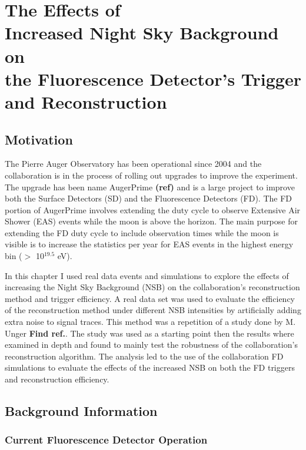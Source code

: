 \chapter[The Effects of Increased NSB on the FD Trigger and Reconstruction]{\centering The Effects of \\ Increased Night Sky Background on \\ the Fluorescence Detector's Trigger and Reconstruction \\ }\label{Ch:SelectEff}

\section{Motivation}

The Pierre Auger Observatory has been operational since 2004 and the collaboration is in the process of rolling out upgrades to improve the experiment. The upgrade has been name AugerPrime \textbf{(ref)} and is a large project to improve both the Surface Detectors (SD) and the Fluorescence Detectors (FD). The FD portion of AugerPrime involves extending the duty cycle to observe Extensive Air Shower (EAS) events while the moon is above the horizon. The main purpose for extending the FD duty cycle to include observation times while the moon is visible is to increase the statistics per year for EAS events in the highest energy bin ($>$ 10$^{19.5}$ eV). 

In this chapter I used real data events and simulations to explore the effects of increasing the Night Sky Background (NSB) on the collaboration's reconstruction method and trigger efficiency. A real data set was used to evaluate the efficiency of the reconstruction method under different NSB intensities by artificially adding extra noise to signal traces. This method was a repetition of a study done by M. Unger \textbf{Find ref.}. The study was used as a starting point then the results where examined in depth and found to mainly test the robustness of the collaboration's reconstruction algorithm. The analysis led to the use of the collaboration FD simulations to evaluate the effects of the increased NSB on both the FD triggers and reconstruction efficiency.

\section{Background Information}

\subsection{Current Fluorescence Detector Operation}


